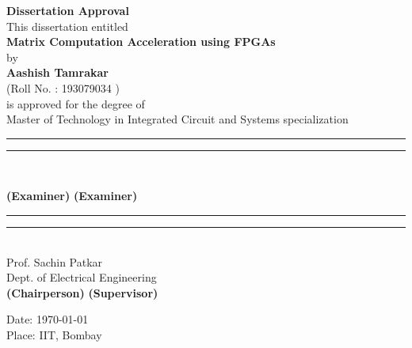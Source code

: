 \begin{Approval}
\noindent

\begin{center}
    {\Large \textbf{Dissertation Approval}}\\
\vspace{10 mm}
This dissertation entitled \\
\vspace{5 mm}
{\large \textbf{Matrix Computation Acceleration using FPGAs}} \\
\vspace{5 mm}
by \\
\vspace{5 mm}
\textbf{Aashish Tamrakar} \\
(Roll No. : 193079034 ) \\
\vspace{7 mm}
is approved for the degree of \\
Master of Technology in Integrated Circuit and Systems specialization
\end{center}

\vspace{50 mm}

\hspace{2 cm}\rule{4cm}{0.4pt}
\hspace{4 cm}
\rule{4cm}{0.4pt} \\
\vspace{1 cm}

\hspace{2.75 cm}\textbf{(Examiner)}
\hspace{5.5 cm}
\textbf{(Examiner)} \\
\vspace{1 cm}

\hspace{2 cm}\rule{4cm}{0.4pt}
\hspace{4 cm}
\rule{4cm}{0.4pt} \\

\vspace{-5 mm}
\hspace{105 mm}Prof. Sachin Patkar \\
\vspace{5 mm}
\hspace{95 mm} Dept. of Electrical Engineering\\

\vspace{-10 mm}
\hspace{2.75 cm}\textbf{(Chairperson)}
\hspace{5 cm}
\textbf{(Supervisor)} \\
\vspace{10 mm}



\begin{flushleft}
Date: \today \\
Place: IIT, Bombay
\end{flushleft}

\end{Approval}